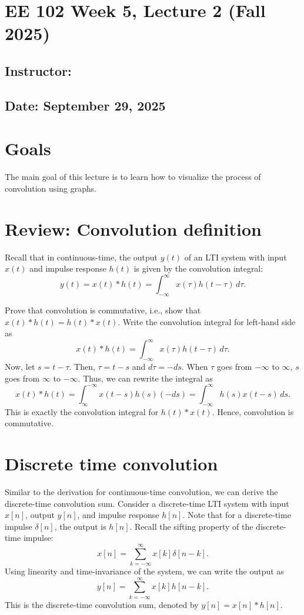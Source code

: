 \documentclass{ee102_notes}
\renewcommand{\releasedate}{September 29, 2025}
\begin{document}
\section*{EE 102 Week 5, Lecture 2 (Fall 2025)}
\subsection*{Instructor: \instructor}
\subsection*{Date: \releasedate}

\section{Goals}
The main goal of this lecture is to learn how to visualize the process of convolution using graphs. 

\section{Review: Convolution definition}
Recall that in continuous-time, the output $y(t)$ of an LTI system with input $x(t)$ and impulse response $h(t)$ is given by the convolution integral:
\[
y(t) = x(t) * h(t) = \int_{-\infty}^{\infty} x(\tau) h(t - \tau) \, d\tau.
\]
\begin{popquiz}
Prove that convolution is commutative, i.e., show that $x(t) * h(t) = h(t) * x(t)$.
\popqsplit 
Write the convolution integral for left-hand side as 
\[
x(t) * h(t) = \int_{-\infty}^{\infty} x(\tau) h(t - \tau) \, d\tau.
\]
Now, let $s = t - \tau$. Then, $\tau = t - s$ and $d\tau = -ds$. When $\tau$ goes from $-\infty$ to $\infty$, $s$ goes from $\infty$ to $-\infty$. Thus, we can rewrite the integral as
\[
x(t) * h(t) = \int_{\infty}^{-\infty} x(t - s) h(s) (-ds) = \int_{-\infty}^{\infty} h(s) x(t - s) \, ds.
\]
This is exactly the convolution integral for $h(t) * x(t)$. Hence, convolution is commutative.
\end{popquiz}
\section{Discrete time convolution}
Similar to the derivation for continuous-time convolution, we can derive the discrete-time convolution sum. Consider a discrete-time LTI system with input $x[n]$, output $y[n]$, and impulse response $h[n]$. Note that for a discrete-time impulse $\delta[n]$, the output is $h[n]$. Recall the sifting property of the discrete-time impulse:
\[
x[n] = \sum_{k=-\infty}^{\infty} x[k] \delta[n - k].
\]
Using linearity and time-invariance of the system, we can write the output as
\[
y[n] = \sum_{k=-\infty}^{\infty} x[k] h[n - k].
\]
This is the discrete-time convolution sum, denoted by $y[n] = x[n] * h[n]$.
\end{document}
